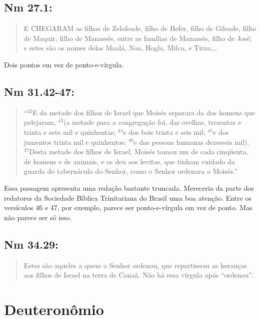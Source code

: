 \subsection{Nm 27.1:}
\begin{quote}
    \small
E CHEGARAM as filhas de Zelofeade, filho de Hefer, filho de Gileade, filho de Maquir, filho de Manassés, entre as famílias de Manassés, filho de José; e estes são os nomes delas\uwave{;} Maalá, Noa, Hogla, Milca, e Tirza;\ldots
\end{quote}

Dois pontos em vez de ponto-e-vírgula.

\subsection{Nm 31.42-47:}
\begin{quote}
    \small
``$^{\mathrm{42}}$E da metade dos filhos de Israel que Moisés separara
da dos homens que pelejaram, $^{\mathrm{43}}$(a metade para a
congregação foi, das ovelhas, trezentas e trinta e sete mil e
quinhentas; $^{\mathrm{44}}$e dos bois trinta e seis mil;
$^{\mathrm{45}}$e dos jumentos trinta mil e quinhentos;
$^{\mathrm{46}}$e das pessoas humanas dezesseis mil).
$^{\mathrm{47}}$Desta metade dos filhos de Israel, Moisés tomou um de
cada cinqüenta, de homens e de animais, e os deu aos levitas, que
tinham cuidado da guarda do tabernáculo do Senhor, como o Senhor
ordenara a Moisés.''
\end{quote}

Essa passagem apresenta uma redação bastante truncada. Mereceria da
parte dos redatores da Sociedade Bíblica Trinitariana do Brasil uma
boa atenção. Entre os versículos 46 e 47, por exemplo, parece ser
ponto-e-vírgula em vez de ponto. Mas não parece ser só isso.

\subsection{Nm 34.29:}
\begin{quote}
    \small
Estes são aqueles a quem o Senhor ordenou\uline{,} que repartissem as heranças aos filhos de Israel na terra de Canaã.
Não há essa vírgula após ``ordenou''.
\end{quote}


\section{Deuteronômio}

